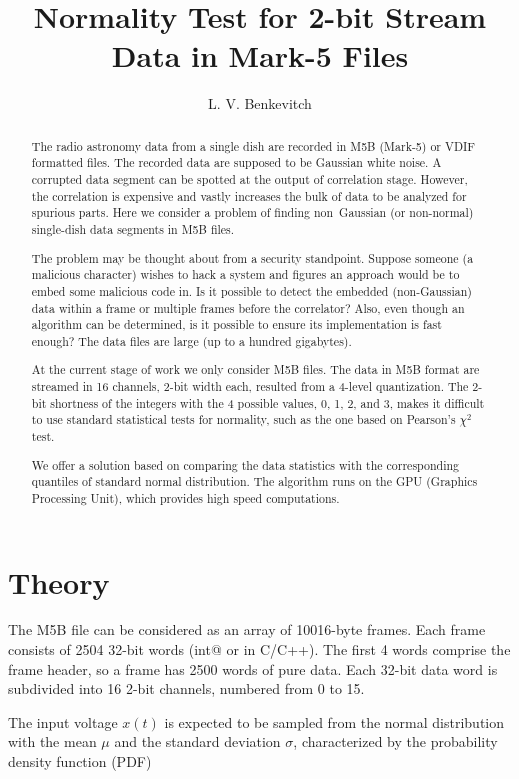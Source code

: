 \documentclass[letterpaper,twoside,12pt]{article}
\title{Normality Test for 2-bit Stream Data in Mark-5 Files}
\author[1]{L. V. Benkevitch}
\affil[1]{\small MIT Haystack observatory, Westford, MA 01886, USA.}
\begin{document}
\maketitle

\begin{abstract}
The radio astronomy data from a single dish are recorded in M5B (Mark-5) or VDIF formatted files. The recorded data are supposed to be Gaussian white noise. A corrupted data segment can be spotted at the output of correlation stage. However, the correlation is expensive and vastly increases the bulk of data to be analyzed for spurious parts. Here we consider a problem of finding non~Gaussian (or non-normal) single-dish data segments in M5B files.

The problem may be thought about from a security standpoint. Suppose someone (a malicious character) wishes to hack a system and figures an approach would be to embed some malicious code in. Is it possible to detect the embedded (non-Gaussian) data within a frame or multiple frames before the correlator? Also, even though an algorithm can be determined, is it possible to ensure its implementation is fast enough? The data files are large (up to a hundred gigabytes).

At the current stage of work we only consider M5B files. The data in M5B format are streamed in 16 channels, 2-bit width each, resulted from a 4-level quantization. The 2-bit shortness of the integers with the 4 possible values, 0, 1, 2, and 3, makes it difficult to use standard statistical tests for normality, such as the one based on Pearson's $\chi^2$ test.     
 
We offer a solution based on comparing the data statistics with the corresponding quantiles of standard normal distribution. The algorithm runs on the GPU (Graphics Processing Unit), which provides high speed computations.
\end{abstract}


\section{Theory}

The M5B file can be considered as an array of 10016-byte frames. Each frame consists of 2504 32-bit words (\verb@unsigned int@ or  \verb@uint@ in C/C++). The first 4 words comprise the frame header, so a frame has 2500 words of pure data. Each 32-bit data word is subdivided into 16 2-bit channels, numbered from 0 to 15. 

The input voltage $x(t)$ is expected to be sampled from the normal distribution with the mean $\mu$ and the standard deviation $\sigma$, characterized by the probability density function (PDF) 
\end{document}
